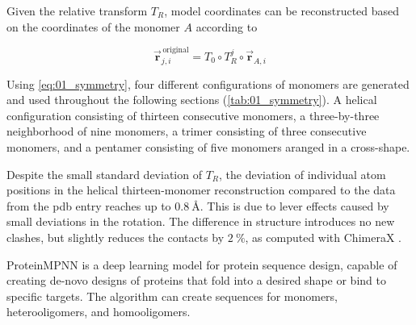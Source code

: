 Given the relative transform $T_R$, model coordinates can be reconstructed based on the coordinates of the monomer $A$ according to 

\begin{equation}\label{eq:01_symmetry}
\vec{\mathbf{r}}_{j,i}^{\,\text{original}} = T_0 \circ T_R^j \circ \vec{\mathbf{r}}_{A,i}
\end{equation}

Using \autoref{eq:01_symmetry}, four different configurations of monomers are generated and used throughout the following sections (\autoref{tab:01_symmetry}). A helical configuration consisting of thirteen consecutive monomers, a three-by-three neighborhood of nine monomers, a trimer consisting of three consecutive monomers, and a pentamer consisting of five monomers aranged in a cross-shape. 

Despite the small standard deviation of $T_R$, the deviation of individual atom positions in the helical thirteen-monomer reconstruction compared to the data from the pdb entry reaches up to $\SI{0.8}{\angstrom}$. This is due to lever effects caused by small deviations in the rotation. The difference in structure introduces no new clashes, but slightly reduces the contacts by $\SI{2}{\percent}$, as computed with ChimeraX \cite{ChimeraX2023}.

ProteinMPNN \cite{PMPNN2022} is a deep learning model for protein sequence design, capable of creating de-novo designs of proteins that fold into a desired shape or bind to specific targets. The algorithm can create sequences for monomers, heterooligomers, and homooligomers. 

